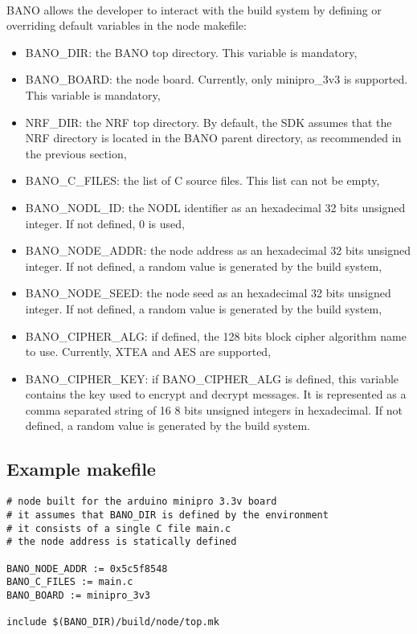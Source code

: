 \documentclass[a4paper, 11pt]{article}
\begin{document}
\paragraph{}
BANO allows the developer to interact with the build system by
defining or overriding default variables in the node makefile:
\begin{itemize}
\item BANO\_DIR: the BANO top directory. This variable is
mandatory,
\item BANO\_BOARD: the node board. Currently, only minipro\_3v3
is supported. This variable is mandatory,
\item NRF\_DIR: the NRF top directory. By default, the SDK
assumes that the NRF directory is located in the BANO parent
directory, as recommended in the previous section,
\item BANO\_C\_FILES: the list of C source files. This list
can not be empty,
\item BANO\_NODL\_ID: the NODL identifier as an hexadecimal
32 bits unsigned integer. If not defined, 0 is used,
\item BANO\_NODE\_ADDR: the node address as an hexadecimal 32
bits unsigned integer. If not defined, a random value is
generated by the build system,
\item BANO\_NODE\_SEED: the node seed as an hexadecimal 32
bits unsigned integer. If not defined, a random value is
generated by the build system,
\item BANO\_CIPHER\_ALG: if defined, the 128 bits block cipher
algorithm name to use. Currently, XTEA and AES are supported,
\item BANO\_CIPHER\_KEY: if BANO\_CIPHER\_ALG is defined, this
variable contains the key used to encrypt and decrypt messages.
It is represented as a comma separated string of 16 8 bits
unsigned integers in hexadecimal. If not defined, a random value
is generated by the build system.
\end{itemize}

\subsection{Example makefile}
\begin{scriptsize}
\begin{verbatim}
# node built for the arduino minipro 3.3v board
# it assumes that BANO_DIR is defined by the environment
# it consists of a single C file main.c
# the node address is statically defined

BANO_NODE_ADDR := 0x5c5f8548
BANO_C_FILES := main.c
BANO_BOARD := minipro_3v3

include $(BANO_DIR)/build/node/top.mk
\end{verbatim}
\end{scriptsize}
\end{document}
